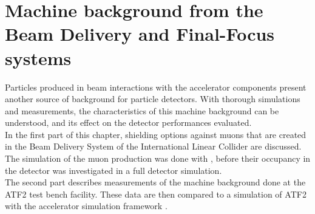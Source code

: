 \chapter{Machine background from the Beam Delivery and Final-Focus systems}

\begin{chapterabstract}
 Particles produced in beam interactions with the accelerator components present another source of background for particle detectors.
 With thorough simulations and measurements,  the characteristics of this machine background can be understood, and its effect on the detector performances evaluated.
 \\In the first part of this chapter, shielding options against muons that are created in the Beam Delivery System of the International Linear Collider are discussed.
 The simulation of the muon production was done with \mucarlo, before their occupancy in the detector was investigated in a full detector simulation.
 \\The second part describes measurements of the machine background done at the ATF2 test bench facility.
 These data are then compared to a simulation of ATF2 with the accelerator simulation framework \bdsim.
\end{chapterabstract}

